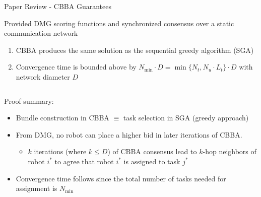 \begin{frame}{Paper Review - CBBA Guarantees}
    \begin{theorem}
        Provided DMG scoring functions and synchronized consensus over a static communication network
        \begin{enumerate}
            \item CBBA produces the same solution as the sequential greedy algorithm (SGA)
            \item Convergence time is bounded above by $N_{\text{min}} \cdot D = \min \{N_t, N_u\cdot L_t\} \cdot D$ with network diameter $D$
        \end{enumerate}
    \end{theorem}
    \begin{columns}
    \begin{column}{0.7\textwidth}
    \pause
    \hspace*{16pt} Proof summary:
    \begin{itemize}
        \item Bundle construction in CBBA $\equiv$ task selection in SGA (greedy approach)
        \item From DMG, no robot can place a higher bid in later iterations of CBBA. \pause
        \begin{itemize}
            \item $k$ iterations (where $k\le D$) of CBBA consensus lead to $k$-hop neighbors of robot $i^*$ to agree that robot $i^*$ is assigned to task $j^*$
        \end{itemize}
        \pause
        \item Convergence time follows since the total number of tasks needed for assignment is $N_{\text{min}}$
    \end{itemize}
    \end{column}


\end{columns}
\end{frame}
